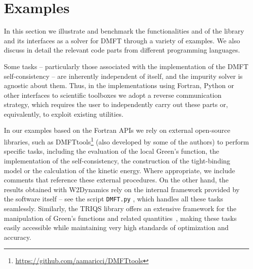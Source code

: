 \documentclass[edipack_sp.tex]{subfiles}
\begin{document}
\section{Examples}\label{SecExamples}
In this section we illustrate and benchmark the functionalities and of the \NAME
library and its interfaces as a solver for DMFT through a variety of examples. We also discuss in detail the relevant code parts from different programming languages. 

Some tasks -- particularly those associated with the implementation of the DMFT self-consistency -- are inherently independent of \NAME itself, and the impurity solver is agnostic about them. 
Thus, in the implementations using Fortran, Python or other \NAME interfaces to scientific toolboxes we adopt a reverse communication strategy, which requires the user to independently carry out these parts or, equivalently, to exploit existing utilities. 

In our examples based on the Fortran APIs we rely on external open-source libraries, such as DMFTtools\footnote{\url{https://github.com/aamaricci/DMFTtools}} (also developed by some of the authors) to perform specific tasks, including the evaluation of the local Green's function, the implementation of the self-consistency, the construction of the tight-binding model or the calculation of the kinetic energy. 
Where appropriate, we include comments that reference these external procedures.
On the other hand, the results obtained with W2Dynamics rely on the internal framework provided by the software itself -- see the script \texttt{DMFT.py} \cite{Wallerberger2019CPC}, which handles all these tasks seamlessly.
Similarly, the TRIQS library offers an extensive framework for the manipulation of Green’s functions and related quantities~\cite{Parcollet2015CPC}, making these tasks easily accessible while maintaining very high standards of optimization and accuracy.
\end{document}
